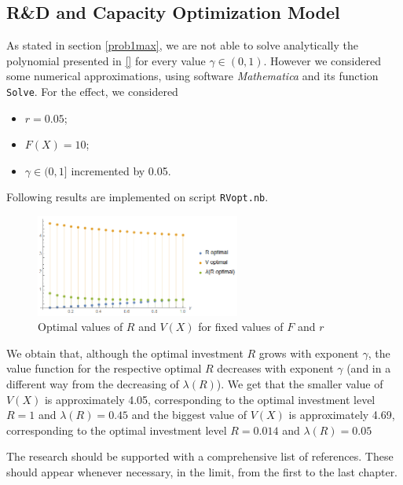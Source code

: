 \subsection{R\&D and Capacity Optimization Model}
\label{subsec:RDcap1}

As stated in section \ref{prob1max}, we are not able to solve analytically the polynomial presented in \eqref{} for every value $\gamma \in (0,1)$. However we considered some numerical approximations, using software \textit{Mathematica} and its function \texttt{Solve}. For the effect, we considered 
\begin{itemize}
	\item $r=0.05$;
	\item $F(X)=10$;
	\item $\gamma \in (0,1]$ incremented by 0.05.
\end{itemize}

Following results are implemented on script \texttt{RVopt.nb}.


\begin{figure}[!htb]
	\centering
	\includegraphics[width=0.6\textwidth]{Prob1_MaxProb/RVlambda_opt05.PNG}
	\caption{Optimal values of $R$ and $V(X)$ for fixed values of $F$ and $r$}
\end{figure}

We obtain that, although the optimal investment $R$ grows with exponent $\gamma$, the value function for the respective optimal $R$ decreases with exponent $\gamma$ (and in a different way from the decreasing of $\lambda(R)$). We get that the smaller value of $V(X)$ is approximately 4.05, corresponding to the optimal investment level $R=1$ and $\lambda(R)=0.45$ and the biggest value of $V(X)$ is approximately 4.69, corresponding to the optimal investment level $R=0.014$ and $\lambda(R)=0.05$















The research should be supported with a comprehensive list of references.
These should appear whenever necessary, in the limit, from the first to the last chapter.

